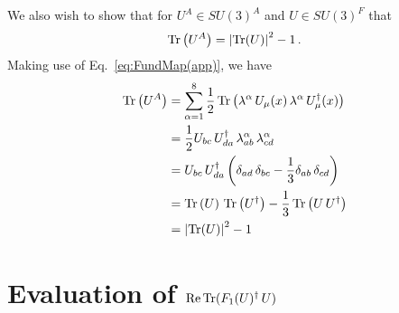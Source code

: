 We also wish to show that for $U^A\in SU(3)^A$ and $U\in SU(3)^F$ that
%
\begin{equation}
\operatorname{Tr}\left(U^A\right) = \left|\operatorname{Tr}(U)\right|^2 -1\, .
\end{equation}
%
Making use of Eq.~\ref{eq:FundMap(app)}, we have
\begin{align*}
\operatorname{Tr}\left(U^A\right) &= \sum_{\alpha=1}^8 \frac{1}{2}\operatorname{Tr}\left(\lambda^\alpha \, U_\mu(x) \, \lambda^\alpha \, U_\mu^\dagger(x)\right)\\
&= \frac{1}{2}U_{bc} \, U^\dagger_{da} \, \lambda_{ab}^\alpha \, \lambda_{cd}^\alpha\\
&= U_{bc} \, U^\dagger_{da} \left(\delta_{ad}\,\delta_{bc} - \frac{1}{3}\delta_{ab}\,\delta_{cd}\right)\\
&= \operatorname{Tr}\left(U\right) \, \operatorname{Tr}\left( U^\dagger \right) - \frac{1}{3}\operatorname{Tr}\left(U\, U^\dagger\right)\\
&= \left|\operatorname{Tr}(U)\right|^2 -1
\end{align*}

\chapter{Evaluation of $\operatorname{Re}\operatorname{Tr}(F_1(U)^\dagger \,U)$}\label{app:CoolingMaximise}

